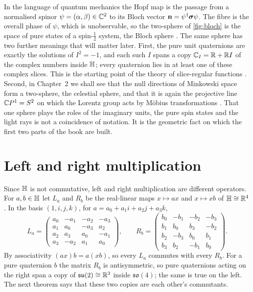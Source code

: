 In the language of quantum mechanics the Hopf map is the passage from a normalised spinor $\psi=(\alpha,\beta)\in\mathbb{C}^2$ to its Bloch vector $\mathbf n=\psi^\dagger\boldsymbol{\sigma}\psi$. The fibre is the overall phase of $\psi$, which is unobservable, so the two-sphere of \cref{fig:bloch} is the space of pure states of a spin-$\frac12$ system, the Bloch sphere \cite{BengtssonZyczkowski}. The same sphere has two further meanings that will matter later. First, the pure unit quaternions are exactly the solutions of $I^2=-1$, and each such $I$ spans a copy $\mathbb{C}_I=\mathbb{R}+\mathbb{R} I$ of the complex numbers inside $\mathbb{H}$; every quaternion lies in at least one of these complex slices. This is the starting point of the theory of slice-regular functions \cite{GentiliStruppa2007}. Second, in Chapter~2 we shall see that the null directions of Minkowski space form a two-sphere, the celestial sphere, and that it is again the projective line $\mathbb{C} P^1=S^2$ on which the Lorentz group acts by M\"obius transformations \cite{PenroseRindler1}. That one sphere plays the roles of the imaginary units, the pure spin states and the light rays is not a coincidence of notation. It is the geometric fact on which the first two parts of the book are built.

\section{Left and right multiplication}

Since $\mathbb{H}$ is not commutative, left and right multiplication are different operators. For $a,b\in\mathbb{H}$ let $L_a$ and $R_b$ be the real-linear maps $x\mapsto ax$ and $x\mapsto xb$ of $\mathbb{H}\cong\mathbb{R}^4$. In the basis $(1,i,j,k)$, for $a=a_0+a_1i+a_2j+a_3k$,
\[
L_a=\begin{pmatrix} a_0&-a_1&-a_2&-a_3\\ a_1&a_0&-a_3&a_2\\ a_2&a_3&a_0&-a_1\\ a_3&-a_2&a_1&a_0\end{pmatrix},\qquad
R_b=\begin{pmatrix} b_0&-b_1&-b_2&-b_3\\ b_1&b_0&b_3&-b_2\\ b_2&-b_3&b_0&b_1\\ b_3&b_2&-b_1&b_0\end{pmatrix}.
\]
By associativity $(ax)b=a(xb)$, so every $L_a$ commutes with every $R_b$. For a pure quaternion $b$ the matrix $R_b$ is antisymmetric, so pure quaternions acting on the right span a copy of $\mathfrak{su}(2)\cong\mathbb{R}^3$ inside $\mathfrak{so}(4)$; the same is true on the left. The next theorem says that these two copies are each other's commutants.

